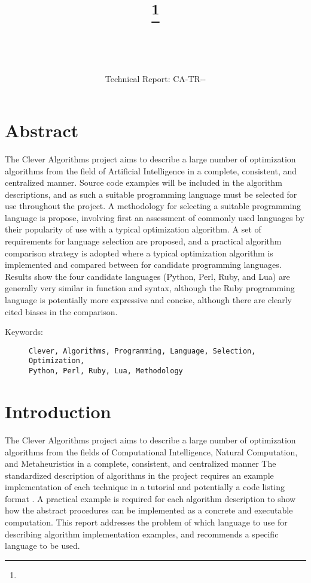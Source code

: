 \documentclass[a4paper, 11pt]{article}
\title{{\myreporttitle}\footnote{\myreportlicense}}
\author{\myreportauthor\\{\myreportemail}\\\small\myreportproject}
\date{\myreportfulldate\\{\small{Technical Report: CA-TR-{\myreportdate}-\myreportversion}}}
\begin{document}
\maketitle

\section*{Abstract} 
The Clever Algorithms project aims to describe a large number of optimization algorithms from the field of Artificial Intelligence in a complete, consistent, and centralized manner.
Source code examples will be included in the algorithm descriptions, and as such a suitable programming language must be selected for use throughout the project.
A methodology for selecting a suitable programming language is propose, involving first an assessment of commonly used languages by their popularity of use with a typical optimization algorithm. A set of requirements for language selection are proposed, and a practical algorithm comparison strategy is adopted where a typical optimization algorithm is implemented and compared between for candidate programming languages. 
Results show the four candidate languages (Python, Perl, Ruby, and Lua) are generally very similar in function and syntax, although the Ruby programming language is potentially more expressive and concise, although there are clearly cited biases in the comparison.

\begin{description}
	\item[Keywords:] {\small\texttt{Clever, Algorithms, Programming, Language, Selection, Optimization, \\
	Python, Perl, Ruby, Lua, Methodology}}
\end{description} 

\section{Introduction}
\label{sec:introduction}
The Clever Algorithms project aims to describe a large number of optimization algorithms from the fields of Computational Intelligence, Natural Computation, and Metaheuristics in a complete, consistent, and centralized manner \cite{Brownlee2010}
The standardized description of algorithms in the project requires an example implementation of each technique in a tutorial and potentially a code listing format \cite{Brownlee2010a}.
A practical example is required for each algorithm description to show how the abstract procedures can be implemented as a concrete and executable computation.
This report addresses the problem of which language to use for describing algorithm implementation examples, and recommends a specific language to be used.
\end{document}
